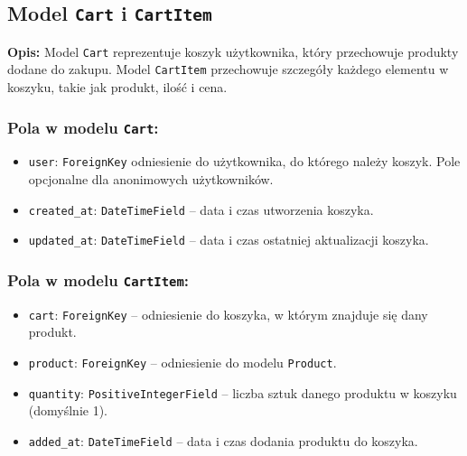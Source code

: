 \documentclass[12pt,a4paper,oneside]{article}
\theoremstyle{definition}
\numberwithin{equation}{section}
\begin{document}
\clearpage

%
% 

\subsection{Model \texttt{Cart} i \texttt{CartItem}}

\textbf{Opis:}  
Model \texttt{Cart} reprezentuje koszyk użytkownika, który przechowuje produkty dodane do zakupu. Model \texttt{CartItem} przechowuje szczegóły każdego elementu w koszyku, takie jak produkt, ilość i cena.

\subsubsection{Pola w modelu \texttt{Cart}:}
\begin{itemize}
    \item \texttt{user}: \texttt{ForeignKey} odniesienie do użytkownika, do którego należy koszyk.
        \subsubitem *Pole opcjonalne dla anonimowych użytkowników.
    \item \texttt{created\_at}: \texttt{DateTimeField} – data i czas utworzenia koszyka.
    \item \texttt{updated\_at}: \texttt{DateTimeField} – data i czas ostatniej aktualizacji koszyka.
\end{itemize}

\subsubsection{Pola w modelu \texttt{CartItem}:}
\begin{itemize}
    \item \texttt{cart}: \texttt{ForeignKey} – odniesienie do koszyka, w którym znajduje się dany produkt.
    \item \texttt{product}: \texttt{ForeignKey} – odniesienie do modelu \texttt{Product}.
    \item \texttt{quantity}: \texttt{PositiveIntegerField} – liczba sztuk danego produktu w koszyku (domyślnie 1).
    \item \texttt{added\_at}: \texttt{DateTimeField} – data i czas dodania produktu do koszyka.
\end{itemize}
\end{document}
